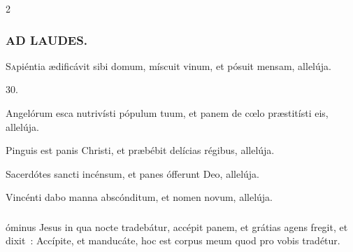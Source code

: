 \documentclass[9pt,twoside]{extarticle}
\begin{document}
\begin{multicols}{2}
\subsubsection*{\center \textsc{AD LAUDES.}}
\begin{center}\end{center}
\lettrine{S}apiéntia ædificávit sibi domum, míscuit vinum, et pósuit mensam, allelúja.

\begin{tightlist}{}
\item {} 30.
\item {} Angelórum esca nutrivísti pópulum tuum, et panem de cœlo præstitísti eis, allelúja.
\item {} Pinguis est panis Christi, et præbébit delícias régibus, allelúja.
\item {} Sacerdótes sancti incénsum, et panes ófferunt Deo, allelúja.
\item {} Vincénti dabo manna abscónditum, et nomen novum, allelúja.
\end{tightlist}

\subsubsection*{}
óminus Jesus in qua nocte tradebátur, accépit panem, et grátias agens fregit, et dixit~: Accípite, et manducáte, hoc est corpus meum quod pro vobis tradétur.


\end{multicols}
\end{document}
